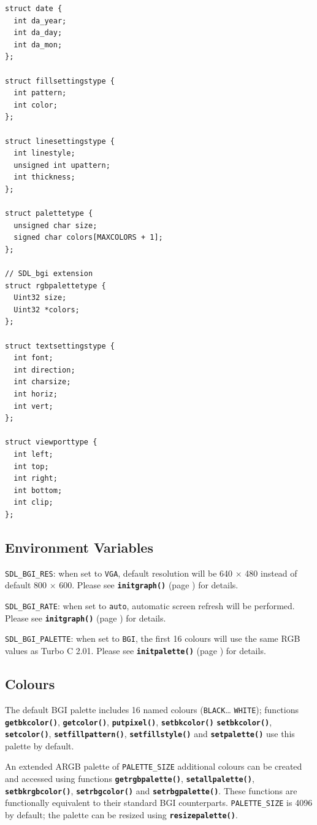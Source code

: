 \documentclass[a4paper,12pt]{article}
\newcommand{\func}[1]{\textbf{\texttt{#1}}}  %
\newcommand{\T}[1]{\texttt{#1}}     %
\begin{document}
\begin{small}
\begin{spacing}{0.85}
\begin{verbatim}
struct date {
  int da_year;
  int da_day;
  int da_mon;
};

struct fillsettingstype {
  int pattern;
  int color;
};

struct linesettingstype {
  int linestyle;
  unsigned int upattern;
  int thickness;
};

struct palettetype {
  unsigned char size;
  signed char colors[MAXCOLORS + 1];
};

// SDL_bgi extension
struct rgbpalettetype {
  Uint32 size;
  Uint32 *colors;
};

struct textsettingstype {
  int font;
  int direction;
  int charsize;
  int horiz;
  int vert;
};

struct viewporttype {
  int left;
  int top;
  int right;
  int bottom;
  int clip;
};
\end{verbatim}
\end{spacing}
\end{small}


\subsection{Environment Variables}

\T{SDL\_BGI\_RES}: when set to \T{VGA}, default resolution will be 640
$\times$ 480 instead of default 800 $\times$ 600. Please see
\func{initgraph()} (page \pageref{sec:initgraph}) for details.

\T{SDL\_BGI\_RATE}: when set to \T{auto}, automatic screen refresh
will be performed. Please see \func{initgraph()} (page
\pageref{sec:initgraph}) for details.

\T{SDL\_BGI\_PALETTE}: when set to \T{BGI}, the first 16 colours will
use the same RGB values as Turbo C 2.01. Please see
\func{initpalette()} (page \pageref{sec:initpalette}) for details.


\subsection{Colours}

The default BGI palette includes 16 named colours (\T{BLACK}{\ldots}
\T{WHITE}); functions \func{getbkcolor()}, \func{getcolor()},
\func{putpixel()}, \func{setbkcolor()} \func{setbkcolor()},
\func{setco\-lor()}, \func{setfillpattern()}, \func{setfillstyle()}
and \func{setpalette()} use this palette by default.

An extended ARGB palette of \T{PALETTE\_SIZE} additional colours can
be created and accessed using functions \func{getrgbpalette()},
\func{setallpalette()}, \func{setbkrgbcolor()}, \func{setrbgcolor()}
and \func{setrbgpalette()}. These functions are functionally
equivalent to their standard BGI counterparts. \T{PALETTE\_SIZE} is
4096 by default; the palette can be resized using
\func{resizepalette()}.
\end{document}

